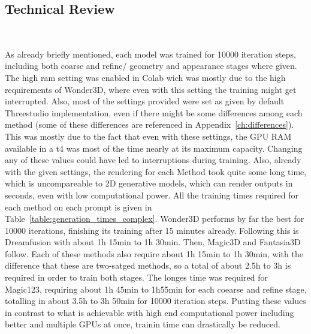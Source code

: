 \subsection{Technical Review}~\label{technical}

As already briefly mentioned, each model was trained for 10000 iteration steps, including both coarse and refine/ geometry and appearance stages where given. The high ram setting was enabled in Colab wich was mostly due to the high requirements of Wonder3D, where even with this setting the training might get interrupted. Also, most of the settings provided were set as given by default Threestudio implementation, even if there might be some differences among each method (some of these differences are referenced in Appendix~\ref{ch:differences}). This was mostly due to the fact that even with these settings, the GPU RAM available in a t4 was most of the time nearly at its maximum capacity. Changing any of these values could have led to interruptions during training. Also, already with the given settings, the rendering for each Method took quite some long time, which is uncompareable to 2D generative models, which can render outputs in seconds, even with low computational power. All the training times required for each method on each prompt is given in Table~\ref{table:generation_times_complex}. 
Wonder3D performs by far the best for 10000 iterations, finishing its training after 15 minutes already. Following this is Dreamfusion with about 1h 15min to 1h 30min. Then, Magic3D and Fantasia3D follow. Each of these methods also require about 1h 15min to 1h 30min, with the difference that these are two-satged methods, so a total of about 2.5h to 3h is required in order to train both stages. The longes time was required for Magic123, requiring about 1h 45min to 1h55min for each coearse and refine stage, totalling in about 3.5h to 3h 50min for 10000 iteration steps. Putting these values in contrast to what is achievable with high end computational power including better and multiple GPUs at once, trainin time can drastically be reduced. 

